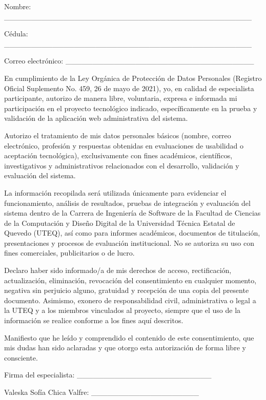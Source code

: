 		Nombre: \_\_\_\_\_\_\_\_\_\_\_\_\_\_\_\_\_\_\_\_\_\_\_\_\_\_\_\_\_\_\_\_\_\_\_\_\_\_\_\_\_\_\_\_\_\_
		
		Cédula: \_\_\_\_\_\_\_\_\_\_\_\_\_\_\_\_\_\_\_\_\_\_\_\_\_\_\_\_\_\_\_\_\_\_\_\_\_\_\_\_\_\_\_\_\_\_
		
		Correo electrónico: \_\_\_\_\_\_\_\_\_\_\_\_\_\_\_\_\_\_\_\_\_\_\_\_\_\_\_\_\_\_\_\_\_\_\_
		
		En cumplimiento de la Ley Orgánica de Protección de Datos Personales (Registro Oficial Suplemento No. 459, 26 de mayo de 2021), yo, en calidad de especialista participante, autorizo de manera libre, voluntaria, expresa e informada mi participación en el proyecto tecnológico indicado, específicamente en la prueba y validación de la aplicación web administrativa del sistema.
		
		Autorizo el tratamiento de mis datos personales básicos (nombre, correo electrónico, profesión y respuestas obtenidas en evaluaciones de usabilidad o aceptación tecnológica), exclusivamente con fines académicos, científicos, investigativos y administrativos relacionados con el desarrollo, validación y evaluación del sistema.
		
		La información recopilada será utilizada únicamente para evidenciar el funcionamiento, análisis de resultados, pruebas de integración y evaluación del sistema dentro de la Carrera de Ingeniería de Software de la Facultad de Ciencias de la Computación y Diseño Digital de la Universidad Técnica Estatal de Quevedo (UTEQ), así como para informes académicos, documentos de titulación, presentaciones y procesos de evaluación institucional. No se autoriza su uso con fines comerciales, publicitarios o de lucro.
		
		Declaro haber sido informado/a de mis derechos de acceso, rectificación, actualización, eliminación, revocación del consentimiento en cualquier momento, negativa sin perjuicio alguno, gratuidad y recepción de una copia del presente documento. Asimismo, exonero de responsabilidad civil, administrativa o legal a la UTEQ y a los miembros vinculados al proyecto, siempre que el uso de la información se realice conforme a los fines aquí descritos.
		
		Manifiesto que he leído y comprendido el contenido de este consentimiento, que mis dudas han sido aclaradas y que otorgo esta autorización de forma libre y consciente.
		
		Firma del especialista: \_\_\_\_\_\_\_\_\_\_\_\_\_\_\_\_\_\_\_\_\_\_\_\_\_
		
		Valeska Sofía Chica Valfre: \_\_\_\_\_\_\_\_\_\_\_\_\_\_\_\_\_\_\_\_
		
